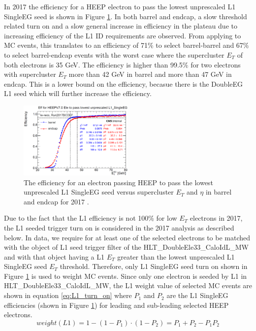 In 2017 the efficiency for a HEEP electron to pass the lowest unprescaled L1 SingleEG seed is shown in Figure \ref{fig:L1_eff_2017}. In both barrel and endcap, a slow threshold related turn on and a slow general increase in efficiency in the plateau due to increasing efficiency of the L1 ID requirements are observed. From applying to MC events, this translates to an efficiency of 71\% to select barrel-barrel and 67\% to select barrel-endcap events with the worst case where the supercluster $E_{T}$ of both electrons is 35 GeV. The efficiency is higher than 99.5\% for two electrons with supercluster $E_{T}$ more than 42 GeV in barrel and more than 47 GeV in endcap. This is a lower bound on the efficiency, becasue there is the DoubleEG L1 seed which will further increase the efficiency.
\begin{figure}[h!]
\begin{center}
\includegraphics[width=0.5\textwidth]{figures/Zprime/2017/trigger/l1SingleEGEff.png}
\caption{The efficiency for an electron passing HEEP to pass the lowest unprescaled L1 SingleEG seed versus supercluster $E_{T}$ and $\eta$ in barrel and endcap for 2017 \cite{CMS-AN-2018-021}.}
\label{fig:L1_eff_2017}
\end{center}
\end{figure}

Due to the fact that the L1 efficiency is not 100\% for low $E_{T}$ electrons in 2017, the L1 seeded trigger turn on is considered in the 2017 analysis as described below. In data, we require for at least one of the selected electrons to be matched with the object of L1 seed trigger filter of the HLT\_DoubleEle33\_CaloIdL\_MW and with that object having a L1 $E_{T}$ greater than the lowest unprescaled L1 SingleEG seed $E_{T}$ threshold. Therefore, only L1 SingleEG seed turn on shown in Figure \ref{fig:L1_eff_2017} is used to weight MC events. Since only one electron is seeded by L1 in HLT\_DoubleEle33\_CaloIdL\_MW, the L1 weight value of selected MC events are shown in equation \ref{eq:L1_turn_on} where $P_{1}$ and $P_{2}$ are the L1 SingleEG efficiencies (shown in Figure \ref{fig:L1_eff_2017}) for leading and sub-leading selected HEEP electrons.
\begin{equation}
weight(L1)=1-(1-P_{1})\cdot(1-P_{2})=P_{1}+P_{2}-P_{1}P_{2}
\label{eq:L1_turn_on}
\end{equation}


